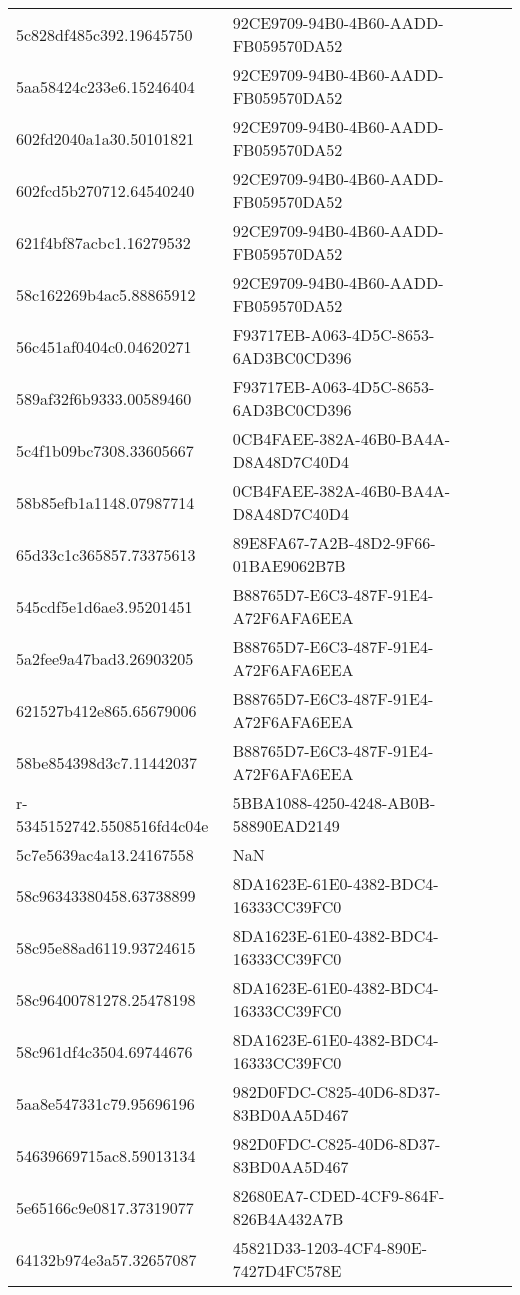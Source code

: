 \begin{tabular}{ll}
5c828df485c392.19645750 & 92CE9709-94B0-4B60-AADD-FB059570DA52 \\
5aa58424c233e6.15246404 & 92CE9709-94B0-4B60-AADD-FB059570DA52 \\
602fd2040a1a30.50101821 & 92CE9709-94B0-4B60-AADD-FB059570DA52 \\
602fcd5b270712.64540240 & 92CE9709-94B0-4B60-AADD-FB059570DA52 \\
621f4bf87acbc1.16279532 & 92CE9709-94B0-4B60-AADD-FB059570DA52 \\
58c162269b4ac5.88865912 & 92CE9709-94B0-4B60-AADD-FB059570DA52 \\
56c451af0404c0.04620271 & F93717EB-A063-4D5C-8653-6AD3BC0CD396 \\
589af32f6b9333.00589460 & F93717EB-A063-4D5C-8653-6AD3BC0CD396 \\
5c4f1b09bc7308.33605667 & 0CB4FAEE-382A-46B0-BA4A-D8A48D7C40D4 \\
58b85efb1a1148.07987714 & 0CB4FAEE-382A-46B0-BA4A-D8A48D7C40D4 \\
65d33c1c365857.73375613 & 89E8FA67-7A2B-48D2-9F66-01BAE9062B7B \\
545cdf5e1d6ae3.95201451 & B88765D7-E6C3-487F-91E4-A72F6AFA6EEA \\
5a2fee9a47bad3.26903205 & B88765D7-E6C3-487F-91E4-A72F6AFA6EEA \\
621527b412e865.65679006 & B88765D7-E6C3-487F-91E4-A72F6AFA6EEA \\
58be854398d3c7.11442037 & B88765D7-E6C3-487F-91E4-A72F6AFA6EEA \\
r-5345152742.5508516fd4c04e & 5BBA1088-4250-4248-AB0B-58890EAD2149 \\
5c7e5639ac4a13.24167558 & NaN \\
58c96343380458.63738899 & 8DA1623E-61E0-4382-BDC4-16333CC39FC0 \\
58c95e88ad6119.93724615 & 8DA1623E-61E0-4382-BDC4-16333CC39FC0 \\
58c96400781278.25478198 & 8DA1623E-61E0-4382-BDC4-16333CC39FC0 \\
58c961df4c3504.69744676 & 8DA1623E-61E0-4382-BDC4-16333CC39FC0 \\
5aa8e547331c79.95696196 & 982D0FDC-C825-40D6-8D37-83BD0AA5D467 \\
54639669715ac8.59013134 & 982D0FDC-C825-40D6-8D37-83BD0AA5D467 \\
5e65166c9e0817.37319077 & 82680EA7-CDED-4CF9-864F-826B4A432A7B \\
64132b974e3a57.32657087 & 45821D33-1203-4CF4-890E-7427D4FC578E \\

\end{tabular}
